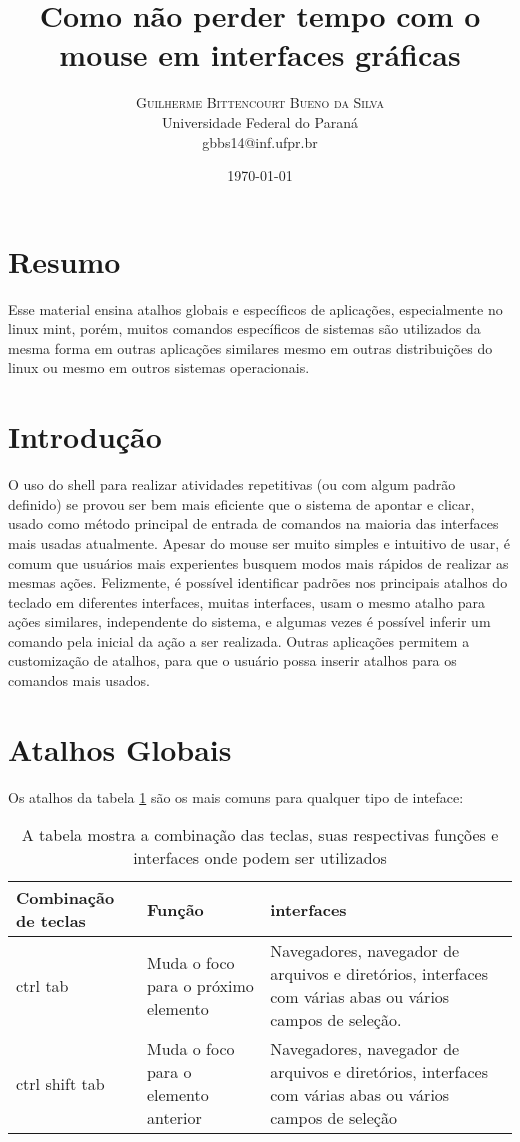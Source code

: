 \documentclass[oneside, 11 pt]{article}
\title{Como não perder tempo com o mouse em interfaces gráficas} %
\author{%
	\textsc{Guilherme Bittencourt Bueno da Silva} \\[1ex] %
	\normalsize Universidade Federal do Paraná \\ %
	\normalsize {gbbs14@inf.ufpr.br} %
}
\date{\today} %
\begin{document}
	
	\maketitle
	
	\section{Resumo}
	Esse material ensina atalhos globais e específicos de aplicações, especialmente no linux mint, porém, muitos comandos específicos de sistemas são utilizados da mesma forma em outras aplicações similares mesmo em outras distribuições do linux ou mesmo em outros sistemas operacionais.
	
	\section{Introdução}
	O uso do shell para realizar atividades repetitivas (ou com algum padrão definido) se provou ser bem mais eficiente que o sistema de apontar e clicar, usado como método principal de entrada de comandos na maioria das interfaces mais usadas atualmente. Apesar do mouse ser muito simples e intuitivo de usar, é comum que usuários mais experientes busquem modos mais rápidos de realizar as mesmas ações. Felizmente, é possível identificar padrões nos principais atalhos do teclado em diferentes interfaces, muitas interfaces, usam o mesmo atalho para ações similares, independente do sistema, e algumas vezes é possível inferir um comando pela inicial da ação a ser realizada. Outras aplicações permitem a customização de atalhos, para que o usuário possa inserir atalhos para os comandos mais usados.
	
	\pagebreak
	
	\section{Atalhos Globais}
	Os atalhos da tabela \ref{table:1} são os mais comuns para qualquer tipo de inteface:
	\begin{table}
		\centering
		\begin{tabular}{|p{2.2cm}|p{3cm}|p{8cm}|}
			\hline
			\bfseries Combinação de teclas & \bfseries Função & \bfseries interfaces \\ \hline
			ctrl tab & Muda o foco para o próximo elemento & Navegadores, navegador de arquivos e diretórios, interfaces com várias abas ou vários campos de seleção. \\ \hline
			ctrl shift tab & Muda o foco para o elemento anterior & Navegadores, navegador de arquivos e diretórios, interfaces com várias abas ou vários campos de seleção \\ \hline
		\end{tabular}
		\caption{A tabela mostra a combinação das teclas, suas respectivas funções e interfaces onde podem ser utilizados}
		\label{table:1}
	\end{table}
	
\end{document}
